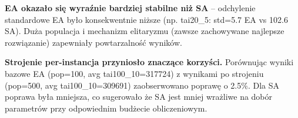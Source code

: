 \documentclass[11pt,a4paper]{article}
\begin{document}
\textbf{EA okazało się wyraźnie bardziej stabilne niż SA} -- odchylenie standardowe EA było konsekwentnie niższe (np. tai20\_5: std=5.7 EA vs 102.6 SA). Duża populacja i mechanizm elitaryzmu (zawsze zachowywane najlepsze rozwiązanie) zapewniały powtarzalność wyników.

\textbf{Strojenie per-instancja przyniosło znaczące korzyści.} Porównując wyniki bazowe EA (pop=100, avg tai100\_10=317724) z wynikami po strojeniu (pop=500, avg tai100\_10=309691) zaobserwowano poprawę o 2.5\%. Dla SA poprawa była mniejsza, co sugerowało że SA jest mniej wrażliwe na dobór parametrów przy odpowiednim budżecie obliczeniowym.
\end{document}
